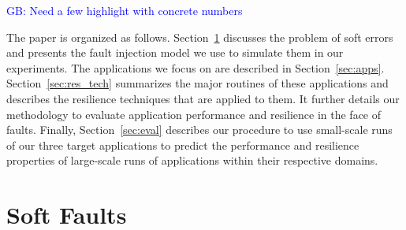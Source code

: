 \documentclass[10pt, conference, compsocconf]{IEEEtran}
\newcommand{\greg}[1]{%
  \textcolor{blue}{GB: #1}
}
\begin{document}

\greg{Need a few highlight with concrete numbers}

The paper is organized as follows.
Section~\ref{sec:soft_faults} discusses the problem of soft errors and presents the fault injection model we use to simulate them in our experiments.
The applications we focus on are described in Section~\ref{sec:apps}.
Section~\ref{sec:res_tech} summarizes the major routines of these applications and describes the resilience techniques that are applied to them.
It further details our methodology to evaluate application performance and resilience in the face of faults.
Finally, Section~\ref{sec:eval} describes our procedure to use small-scale runs of our three target applications to predict the performance and resilience properties of large-scale runs of applications within their respective domains.

\section{Soft Faults}
\label{sec:soft_faults}
\end{document}

